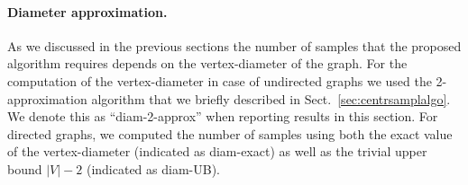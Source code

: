 \paragraph{Diameter approximation.}
As we discussed in the previous sections the number of samples that the proposed
algorithm requires depends on the vertex-diameter of the graph. 
For the computation of the vertex-diameter in case of undirected graphs we used
the 2-approximation algorithm that we briefly described in Sect.~\ref{sec:centrsamplalgo}.
We denote this as ``diam-2-approx'' when reporting results in this section. For
directed graphs, we computed the number of samples using both the exact value of
the vertex-diameter (indicated as diam-exact) as well as the trivial upper bound
$|V|-2$ (indicated as diam-UB). 



